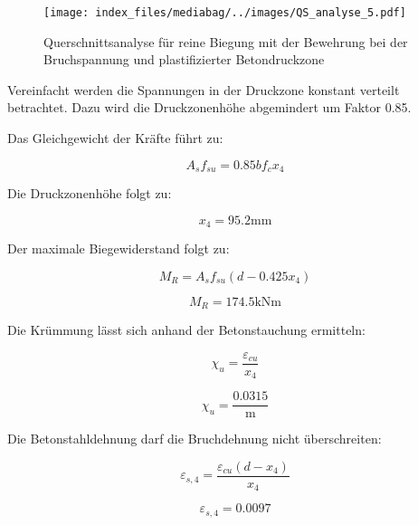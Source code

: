 \documentclass[
  letterpaper,
]{scrreprt}
\begin{document}
\begin{figure}[H]

{\centering \texttt{[image: index\_files/mediabag/../images/QS\_analyse\_5.pdf]}

}

\caption{\label{fig-qs5}Querschnittsanalyse für reine Biegung mit der
Bewehrung bei der Bruchspannung und plastifizierter Betondruckzone}

\end{figure}

Vereinfacht werden die Spannungen in der Druckzone konstant verteilt
betrachtet. Dazu wird die Druckzonenhöhe abgemindert um Faktor 0.85.

Das Gleichgewicht der Kräfte führt zu:

\begin{equation}A_{s} f_{su} = 0.85 b f_{c} x_{4}\end{equation}

Die Druckzonenhöhe folgt zu:

\begin{equation}x_{4} = 95.2 \text{mm}\end{equation}

Der maximale Biegewiderstand folgt zu:

\begin{equation}M_{R} = A_{s} f_{su} \left(d - 0.425 x_{4}\right)\end{equation}

\begin{equation}M_{R} = 174.5 \text{kN} \text{m}\end{equation}

Die Krümmung lässt sich anhand der Betonstauchung ermitteln:

\begin{equation}\chi_{u} = \frac{\varepsilon_{cu}}{x_{4}}\end{equation}

\begin{equation}\chi_{u} = \frac{0.0315}{\text{m}}\end{equation}

Die Betonstahldehnung darf die Bruchdehnung nicht überschreiten:

\begin{equation}\varepsilon_{s,4} = \frac{\varepsilon_{cu} \left(d - x_{4}\right)}{x_{4}}\end{equation}

\begin{equation}\varepsilon_{s,4} = 0.0097\end{equation}
\end{document}

